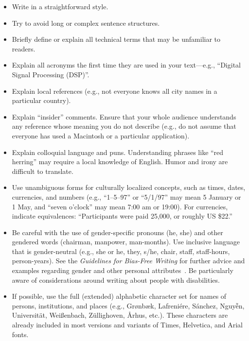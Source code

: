 \documentclass{sigchi}
\begin{document}
\begin{itemize}
\item Write in a straightforward style.
\item Try to avoid long or complex sentence structures.
\item Briefly define or explain all technical terms that may be
  unfamiliar to readers.
\item Explain all acronyms the first time they are used in your
  text---e.g., ``Digital Signal Processing (DSP)''.
\item Explain local references (e.g., not everyone knows all city
  names in a particular country).
\item Explain ``insider'' comments. Ensure that your whole audience
  understands any reference whose meaning you do not describe (e.g.,
  do not assume that everyone has used a Macintosh or a particular
  application).
\item Explain colloquial language and puns. Understanding phrases like
  ``red herring'' may require a local knowledge of English.  Humor and
  irony are difficult to translate.
\item Use unambiguous forms for culturally localized concepts, such as
  times, dates, currencies, and numbers (e.g., ``1--5--97'' or
  ``5/1/97'' may mean 5 January or 1 May, and ``seven o'clock'' may
  mean 7:00 am or 19:00). For currencies, indicate equivalences:
  ``Participants were paid {\selectfont \textwon}
  25,000, or roughly US \$22.''
\item Be careful with the use of gender-specific pronouns (he, she)
  and other gendered words (chairman, manpower, man-months). Use
  inclusive language that is gender-neutral (e.g., she or he, they,
  s/he, chair, staff, staff-hours, person-years). See the
  \textit{Guidelines for Bias-Free Writing} for further advice and
  examples regarding gender and other personal
  attributes~\cite{Schwartz:1995:GBF}. Be particularly aware of
  considerations around writing about people with disabilities.
\item If possible, use the full (extended) alphabetic character set
  for names of persons, institutions, and places (e.g.,
  Gr{\o}nb{\ae}k, Lafreni\'ere, S\'anchez, Nguy{\~{\^{e}}}n,
  Universit{\"a}t, Wei{\ss}enbach, Z{\"u}llighoven, \r{A}rhus, etc.).
  These characters are already included in most versions and variants
  of Times, Helvetica, and Arial fonts.
\end{itemize}
\end{document}
